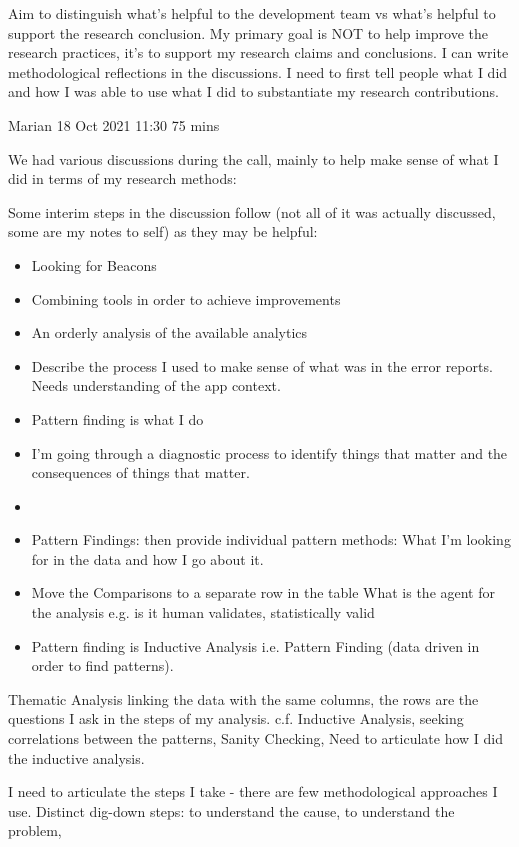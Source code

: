Aim to distinguish what’s helpful to the development team vs what's helpful to support the research conclusion. My primary goal is NOT to help improve the research practices, it’s to support my research claims and conclusions. I can write methodological reflections in the discussions. I need to first tell people what I did and how I was able to use what I did to substantiate my research contributions.  

\dotfill
Marian 18 Oct 2021 11:30 75 mins

We had various discussions during the call, mainly to help make sense of what I did in terms of my research methods:

Some interim steps in the discussion follow (not all of it was actually discussed, some are my notes to self) as they may be helpful:
\begin{itemize}
    \item Looking for Beacons
    \item Combining tools in order to achieve improvements
    \item An orderly analysis of the available analytics
    \item Describe the process I used to make sense of what was in the error reports. Needs understanding of the app context. 
    \item Pattern finding is what I do
    \item I’m going through a diagnostic process to identify things that matter and the consequences of things that matter.
    \item {}
    \item Pattern Findings: then provide individual pattern methods: What I’m looking for in the data and how I go about it. 
    \item Move the Comparisons to a separate row in the table
What is the agent for the analysis e.g. is it human validates, statistically valid
    \item Pattern finding is Inductive Analysis i.e. Pattern Finding (data driven in order to find patterns).
\end{itemize}


Thematic Analysis linking the data with the same columns, the rows are the questions I ask in the steps of my analysis.
c.f. Inductive Analysis, seeking correlations between the patterns, Sanity Checking, Need to articulate how I did the inductive analysis. 

I need to articulate the steps I take - there are few methodological approaches I use.
Distinct dig-down steps: to understand the cause, to understand the problem, 

